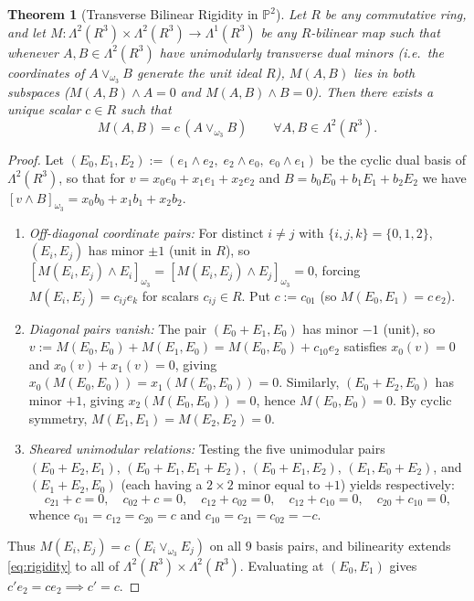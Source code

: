 \documentclass[11pt]{article}
\newtheorem{theorem}{Theorem}[section]
\theoremstyle{definition}
\newcommand{\Psp}{\mathbb{P}}
\begin{document}
\begin{theorem}[Transverse Bilinear Rigidity in $\Psp^2$]\label{thm:rigidity}
Let $R$ be any commutative ring, and let $M : \Lambda^2(R^3) \times \Lambda^2(R^3) \to \Lambda^1(R^3)$ be any $R$-bilinear map such that whenever $A, B \in \Lambda^2(R^3)$ have unimodularly transverse dual minors (i.e.\ the coordinates of $A \vee_{\omega_3} B$ generate the unit ideal $R$), $M(A, B)$ lies in both subspaces ($M(A,B) \wedge A = 0$ and $M(A,B) \wedge B = 0$). Then there exists a unique scalar $c \in R$ such that
\begin{equation}\label{eq:rigidity}
  M(A, B) = c\,(A \vee_{\omega_3} B) \qquad \forall A, B \in \Lambda^2(R^3).
\end{equation}
\end{theorem}
\begin{proof}
Let $(E_0, E_1, E_2) := (e_1 \wedge e_2,\; e_2 \wedge e_0,\; e_0 \wedge e_1)$ be the cyclic dual basis of $\Lambda^2(R^3)$, so that for $v = x_0 e_0 + x_1 e_1 + x_2 e_2$ and $B = b_0 E_0 + b_1 E_1 + b_2 E_2$ we have $[v \wedge B]_{\omega_3} = x_0 b_0 + x_1 b_1 + x_2 b_2$.
\begin{enumerate}
  \item \emph{Off-diagonal coordinate pairs:} For distinct $i \neq j$ with $\{i,j,k\} = \{0,1,2\}$, $(E_i, E_j)$ has minor $\pm 1$ (unit in $R$), so $[M(E_i, E_j) \wedge E_i]_{\omega_3} = [M(E_i, E_j) \wedge E_j]_{\omega_3} = 0$, forcing $M(E_i, E_j) = c_{ij} e_k$ for scalars $c_{ij} \in R$. Put $c := c_{01}$ (so $M(E_0, E_1) = c\,e_2$).
  \item \emph{Diagonal pairs vanish:} The pair $(E_0 + E_1, E_0)$ has minor $-1$ (unit), so $v := M(E_0, E_0) + M(E_1, E_0) = M(E_0, E_0) + c_{10} e_2$ satisfies $x_0(v) = 0$ and $x_0(v) + x_1(v) = 0$, giving $x_0(M(E_0, E_0)) = x_1(M(E_0, E_0)) = 0$. Similarly, $(E_0 + E_2, E_0)$ has minor $+1$, giving $x_2(M(E_0, E_0)) = 0$, hence $M(E_0, E_0) = 0$. By cyclic symmetry, $M(E_1, E_1) = M(E_2, E_2) = 0$.
  \item \emph{Sheared unimodular relations:} Testing the five unimodular pairs $(E_0 + E_2, E_1)$, $(E_0 + E_1, E_1 + E_2)$, $(E_0 + E_1, E_2)$, $(E_1, E_0 + E_2)$, and $(E_1 + E_2, E_0)$ (each having a $2 \times 2$ minor equal to $+1$) yields respectively:
  \[
    c_{21} + c = 0,\quad c_{02} + c = 0,\quad c_{12} + c_{02} = 0,\quad c_{12} + c_{10} = 0,\quad c_{20} + c_{10} = 0,
  \]
  whence $c_{01} = c_{12} = c_{20} = c$ and $c_{10} = c_{21} = c_{02} = -c$.
\end{enumerate}
Thus $M(E_i, E_j) = c\,(E_i \vee_{\omega_3} E_j)$ on all $9$ basis pairs, and bilinearity extends \eqref{eq:rigidity} to all of $\Lambda^2(R^3) \times \Lambda^2(R^3)$. Evaluating at $(E_0, E_1)$ gives $c' e_2 = c e_2 \implies c' = c$.
\end{proof}
\end{document}
